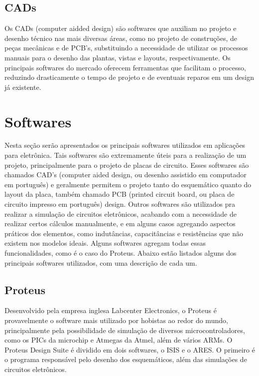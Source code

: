 \subsection{CADs}

Os CADs (computer aidded design) s\~ao softwares que auxiliam no projeto e desenho t\'ecnico nas mais diversas \'areas, como no projeto de construç\~oes, de peças mec\^anicas e de PCB's, substituindo a necessidade de utilizar os processos manuais para o desenho das plantas, vistas e layouts, respectivamente. Os principais softwares do mercado oferecem ferramentas que facilitam o processo, reduzindo drasticamente o tempo de projeto e de eventuais reparos em um design j\'a existente.


\section{Softwares}
Nesta seç\~ao ser\~ao apresentados os principais softwares utilizados em aplicaç\~oes para eletr\^onica. Tais softwares s\~ao extremamente \'uteis para a realizaç\~ao de um projeto, principalmente para o projeto de placas de circuito. Esses softwares s\~ao chamados CAD's (computer aided design, ou desenho assistido em computador em portugu\^es) e geralmente permitem o projeto tanto do esquem\'atico quanto do layout da placa, tamb\'em chamado PCB (printed circuit board, ou placa de circuito impresso em portugu\^es) design. Outros softwares s\~ao utilizados pra realizar a simulaç\~ao de circuitos eletr\^onicos, acabando com a necessidade de realizar certos c\'alculos manualmente, e em alguns casos agregando aspectos pr\'aticos dos elementos, como indut\^ancias, capacit\^ancias e resist\^encias que n\~ao existem nos modelos ideais. Alguns softwares agregam todas essas funcionalidades, como \'e o caso do Proteus.
Abaixo est\~ao listados alguns dos principais softwares utilizados, com uma descriç\~ao de cada um.

\subsection{Proteus}
Desenvolvido pela empresa inglesa Labcenter Electronics, o Proteus \'e provavelmente o software mais utilizado por hobistas ao redor do mundo, principalmente pela possibilidade de simulaç\~ao de diversos microcontroladores, como os PICs da microchip e Atmegas da Atmel, além de v\'arios ARMs.
O Proteus Design Suite \'e dividido em dois softwares, o ISIS e o ARES. O primeiro \'e o programa respons\'avel pelo desenho dos esquem\'aticos, al\'em das simulaç\~oes de circuitos eletr\^onicos.

